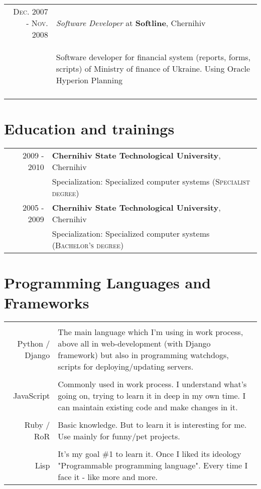 \documentclass[a4paper,10pt]{article}
\begin{document}
\begin{tabular}{rp{11cm}}
  \textsc{Dec. 2007 - Nov. 2008} & \emph{Software Developer} at \textbf{Softline}, Chernihiv\\ 
  & \begin{compactitem} 
    \item Software developer for financial system (reports, forms, scripts) of Ministry of finance of Ukraine. Using Oracle Hyperion Planning
    \end{compactitem}\vspace{-1em} \\
\multicolumn{2}{c}{} \\

\end{tabular}

\section{Education and trainings}
\begin{tabular}{rl}
2009 - 2010 & \textbf{Chernihiv State Technological University}, Chernihiv \\
 & Specialization: Specialized computer systems (\textsc{Specialist degree}) \\

2005 - 2009 & \textbf{Chernihiv State Technological University}, Chernihiv \\
 & Specialization: Specialized computer systems (\textsc{Bachelor's degree}) \\
\end{tabular}

\section{Programming Languages and Frameworks}
 \begin{tabular}{r|p{11cm}}
 \multicolumn{2}{c}{} \\
  Python / Django & The main language which I'm using in work process, above all in web-development (with Django framework) but also in programming watchdogs, scripts for deploying/updating servers.\\
 \multicolumn{2}{c}{} \\
  JavaScript & Commonly used in work process. I understand what's going on, trying to learn it in deep in my own time. I can maintain existing code and make changes in it.   \\
 \multicolumn{2}{c}{} \\
  Ruby / RoR & Basic knowledge. But to learn it is interesting for me. Use mainly for funny/pet projects. \\
 \multicolumn{2}{c}{} \\
  Lisp & It's my goal \#1 to learn it. Once I liked its ideology "Programmable programming language". Every time I face it - like more and more. \\
 \end{tabular}
\end{document}
